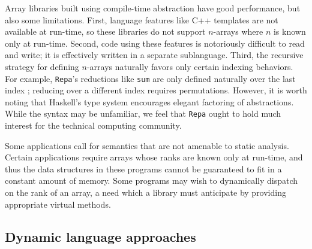 \documentclass[preprint]{sigplanconf}
\newcommand{\code}[1]{\texttt{#1}}
\begin{document}
Array libraries built using compile-time abstraction have good performance,
but also some limitations.
First, language features like C++ templates are not available at run-time, so these
libraries do not support $n$-arrays where $n$ is known only at run-time.
Second, code using these features is
notoriously difficult to read and write; it is effectively written in a
separate sublanguage.
Third, the recursive strategy for defining $n$-arrays
naturally favors only certain indexing behaviors. For example,
\code{Repa}'s reductions like \code{sum} are only defined naturally over the
last index \cite{Keller:2010rs}; reducing over a different index requires
permutations.
However, it is worth noting that Haskell's type system encourages
elegant factoring of abstractions. While the syntax may be unfamiliar,
we feel that \code{Repa} ought to hold much interest for the technical computing
community.

Some applications call for semantics that are not amenable
to static analysis. Certain applications require arrays whose ranks are known
only at run-time, and thus the data structures in these programs cannot be
guaranteed to fit in a constant amount of memory. Some programs may
wish to dynamically dispatch on the rank of an array, a need which a
library must anticipate by providing appropriate virtual methods.


\subsection{Dynamic language approaches}
\end{document}
